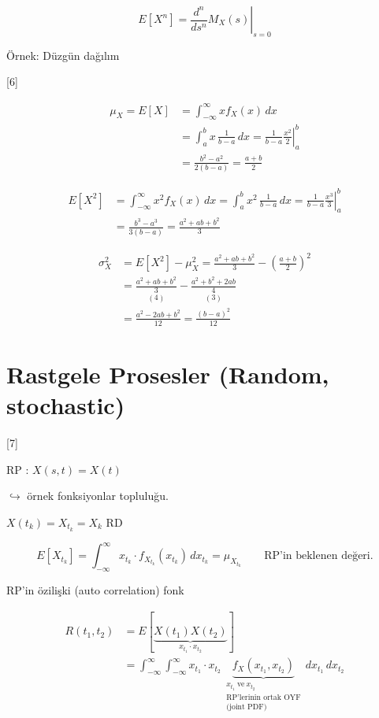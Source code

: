\documentclass[11pt,a4paper]{article}
\begin{document}
\[ E[X^n]=\left.\frac{d^n}{ds^n}M_X(s)\right|_{s=0} \]

\textcolor{kirmizikalem}{Örnek:} Düzgün dağılım

[6]

\begin{align*}
\mu_X=E[X] &= \int_{-\infty}^{\infty} x f_X(x)\,dx\\
&= \int_{a}^{b} x\,\frac{1}{b-a}\,dx = \frac{1}{b-a}\left.\frac{x^2}{2}\right|_{a}^{b}\\
&= \frac{b^2-a^2}{2(b-a)} = \frac{a+b}{2}
\end{align*}

\begin{align*}
E[X^2] &= \int_{-\infty}^{\infty} x^2 f_X(x)\,dx = \int_{a}^{b} x^2\,\frac{1}{b-a}\,dx = \frac{1}{b-a}\left.\frac{x^3}{3}\right|_{a}^{b}\\
&= \frac{b^3-a^3}{3(b-a)} = \frac{a^2+ab+b^2}{3}
\end{align*}

\begin{align*}
\sigma_X^2 &= E[X^2]-\mu_X^2 = \frac{a^2+ab+b^2}{3}-\left(\frac{a+b}{2}\right)^2\\
&= \underset{(4)}{\frac{a^2+ab+b^2}{3}} - \underset{(3)}{\frac{a^2+b^2+2ab}{4}}\\
&= \frac{a^2-2ab+b^2}{12} = \frac{(b-a)^2}{12}
\end{align*}


\section{Rastgele Prosesler (Random, stochastic)}

[7]

RP : $X(s,t)=X(t)$

$\hookrightarrow$ örnek fonksiyonlar topluluğu.

$X(t_k)=X_{t_k}=X_k$ \quad RD

\[ E[X_{t_k}]=\int_{-\infty}^{\infty} x_{t_k}\cdot f_{X_{t_k}}(x_{t_k})\,dx_{t_k}=\mu_{X_{t_k}}\qquad\text{RP'in beklenen değeri.} \]

RP'in özilişki (auto correlation) fonk

\begin{align*}
R(t_1,t_2) &= E[\underbrace{X(t_1)X(t_2)}_{x_{t_1}\cdot x_{t_2}}]\\
&= \int_{-\infty}^{\infty}\!\int_{-\infty}^{\infty} x_{t_1}\cdot x_{t_2}\,\underbrace{f_X(x_{t_1},x_{t_2})}_{\substack{x_{t_1}\ \text{ve}\ x_{t_2}\\ \text{RP'lerinin ortak OYF}\\ \text{(joint PDF)}}}\,dx_{t_1}\,dx_{t_2}
\end{align*}
\end{document}
